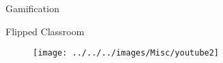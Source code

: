 \documentclass[final,hyperref={pdfpagelabels=false}]{beamer}
\begin{document}
\begin{frame}[t]
\begin{columns}[t]
\begin{column}{.465\textwidth}
\begin{block}{Gamification}
\end{block}


\begin{block}{Flipped Classroom}
    \vspace{40px}
    \begin{figure}
        \centering
        \texttt{[image: ../../../images/Misc/youtube2]}
        \label{fig:youtube2}
    \end{figure}
\end{block}


\end{column} %

\begin{column}{.015\textwidth}\end{column} %

\end{columns} %

\end{frame} %

\end{document}
